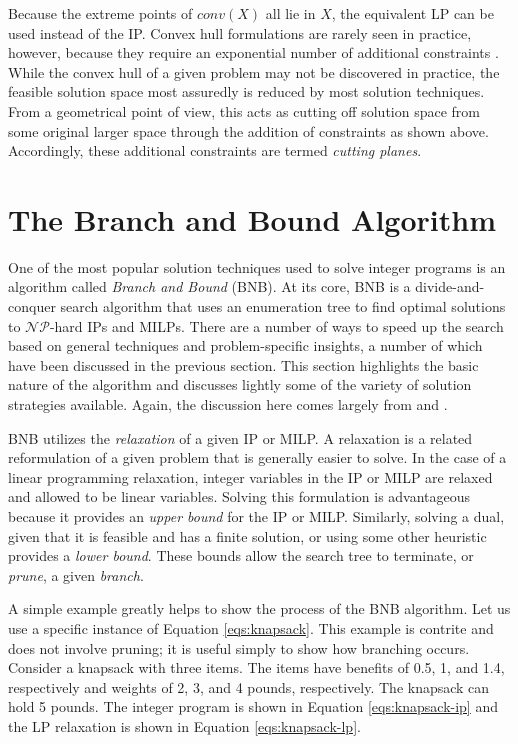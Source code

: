 Because the extreme points of $conv(X)$ all lie in $X$, the equivalent LP can be
used instead of the IP. Convex hull formulations are rarely seen in practice,
however, because they require an exponential number of additional
constraints \cite{wolsey_integer_1998}. While the convex hull of a given problem
may not be discovered in practice, the feasible solution space most assuredly is
reduced by most solution techniques. From a geometrical point of view, this acts
as cutting off solution space from some original larger space through the
addition of constraints as shown above. Accordingly, these additional
constraints are termed \textit{cutting planes}.

\section{The Branch and Bound Algorithm}\label{sec:bnb}

One of the most popular solution techniques used to solve integer programs is an
algorithm called \textit{Branch and Bound} (BNB). At its core, BNB is a
divide-and-conquer search algorithm that uses an enumeration tree to find
optimal solutions to $\mathcal{NP}$-hard IPs and MILPs. There are a number of
ways to speed up the search based on general techniques and problem-specific
insights, a number of which have been discussed in the previous section. This
section highlights the basic nature of the algorithm and discusses lightly some
of the variety of solution strategies available. Again, the discussion here
comes largely from \cite{wolsey_integer_1998} and \cite{luedtke_class_2010}.

BNB utilizes the \textit{relaxation} of a given IP or MILP. A relaxation is a
related reformulation of a given problem that is generally easier to solve. In
the case of a linear programming relaxation, integer variables in the IP or MILP
are relaxed and allowed to be linear variables. Solving this formulation is
advantageous because it provides an \textit{upper bound} for the IP or
MILP. Similarly, solving a dual, given that it is feasible and has a finite
solution, or using some other heuristic provides a \textit{lower bound}. These
bounds allow the search tree to terminate, or \textit{prune}, a
given \textit{branch}.

A simple example greatly helps to show the process of the BNB algorithm. Let us
use a specific instance of Equation \ref{eqs:knapsack}. This example is
contrite and does not involve pruning; it is useful simply to show how
branching occurs. Consider a knapsack with three items. The items have benefits
of 0.5, 1, and 1.4, respectively and weights of 2, 3, and 4 pounds,
respectively. The knapsack can hold 5 pounds. The integer program is shown in
Equation \ref{eqs:knapsack-ip} and the LP relaxation is shown in
Equation \ref{eqs:knapsack-lp}.

